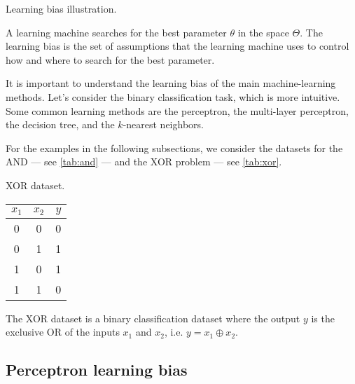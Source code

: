 \begin{figurebox}[label=fig:learning-bias]{Learning bias illustration.}
  \centering
  \tcblower
  A learning machine searches for the best parameter $\theta$ in the space $\Theta$.
  The learning bias is the set of assumptions that the learning machine uses to control
  how and where to search for the best parameter.
\end{figurebox}

It is important to understand the learning bias of the main machine-learning methods.  Let's
consider the binary classification task, which is more intuitive.  Some common learning
methods are the perceptron, the multi-layer perceptron, the decision tree, and the
$k$-nearest neighbors.

For the examples in the following subsections, we consider the datasets for the AND
--- see \cref{tab:and} --- and the XOR problem --- see \cref{tab:xor}.

\begin{tablebox}[label=tab:xor]{XOR dataset.}
  \centering
  \begin{tabular}{ccc}
    \toprule
    $x_1$ & $x_2$ & $y$ \\
    \midrule
    0 & 0 & 0 \\
    0 & 1 & 1 \\
    1 & 0 & 1 \\
    1 & 1 & 0 \\
    \bottomrule
  \end{tabular}
  \tcblower
  The XOR dataset is a binary classification dataset where the output $y$ is the exclusive
  OR of the inputs $x_1$ and $x_2$, i.e. $y = x_1 \oplus x_2$.
\end{tablebox}

\subsection{Perceptron learning bias}

